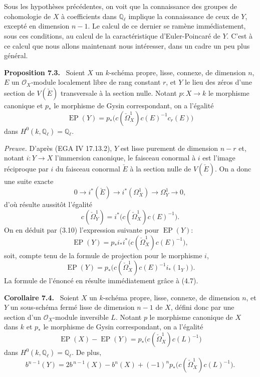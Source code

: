 \documentclass[11pt]{article}
\newenvironment{statement}[1]{\par\medskip\noindent\textbf{#1.}\ }{\par\medskip}
\begin{document}
Sous les hypothèses précédentes, on voit que la connaissance des groupes de cohomologie de $X$ à coefficients dans $\mathbb Q_\ell$ implique la connaissance de ceux de $Y$, excepté en dimension $n-1$. Le calcul de ce dernier se ramène immédiatement, sous ces conditions, au calcul de la caractéristique d'Euler-Poincaré de $Y$. C'est à ce calcul que nous allons maintenant nous intéresser, dans un cadre un peu plus général.

\begin{statement}{Proposition 7.3}
Soient $X$ un $k$-schéma propre, lisse, connexe, de dimension $n$, $E$ un $\mathcal O_X$-module localement libre de rang constant $r$, et $Y$ le lieu des zéros d'une section de $V(\check E)$ transversale à la section nulle. Notant $p:X\to k$ le morphisme canonique et $p_*$ le morphisme de Gysin correspondant, on a l'égalité
\[
\operatorname{EP}(Y)=p_*\bigl(c(\check\Omega_X^1)c(E)^{-1}c_r(E)\bigr)
\]
dans $H^0(k,\mathbb Q_\ell)=\mathbb Q_\ell$.
\end{statement}

\emph{Preuve.} D'après (EGA IV 17.13.2), $Y$ est lisse purement de dimension $n-r$ et, notant $i:Y\to X$ l'immersion canonique, le faisceau conormal à $i$ est l'image réciproque par $i$ du faisceau conormal $\check E$ à la section nulle de $V(\check E)$. On a donc une suite exacte
\[
0\to i^*(\check E)\to i^*(\Omega_X^1)\to\Omega_Y^1\to0,
\tag{7.3.1}
\]
d'où résulte aussitôt l'égalité
\[
c(\check\Omega_Y^1)=i^*\bigl(c(\check\Omega_X^1)c(E)^{-1}\bigr).
\tag{7.3.2}
\]
On en déduit par (3.10) l'expression suivante pour $\operatorname{EP}(Y)$:
\[
\operatorname{EP}(Y)=p_*i_*i^*\bigl(c(\check\Omega_X^1)c(E)^{-1}\bigr),
\]
soit, compte tenu de la formule de projection pour le morphisme $i$,
\[
\operatorname{EP}(Y)=p_*\bigl(c(\check\Omega_X^1)c(E)^{-1}i_*(1_Y)\bigr).
\]
La formule de l'énoncé en résulte immédiatement grâce à (4.7).

\begin{statement}{Corollaire 7.4}
Soient $X$ un $k$-schéma propre, lisse, connexe, de dimension $n$, et $Y$ un sous-schéma fermé lisse de dimension $n-1$ de $X$, défini donc par une section d'un $\mathcal O_X$-module inversible $L$. Notant $p$ le morphisme canonique de $X$ dans $k$ et $p_*$ le morphisme de Gysin correspondant, on a l'égalité
\[
\operatorname{EP}(X)-\operatorname{EP}(Y)=p_*\bigl(c(\check\Omega_X^1)c(L)^{-1}\bigr)
\tag{7.4.1}
\]
dans $H^0(k,\mathbb Q_\ell)=\mathbb Q_\ell$. De plus,
\[
b^{n-1}(Y)=2b^{\,n-1}(X)-b^n(X)+(-1)^n p_*\bigl(c(\check\Omega_X^1)c(L)^{-1}\bigr).
\tag{7.4.2}
\]
\end{statement}
\end{document}
